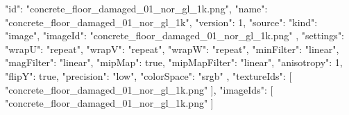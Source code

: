 {
  "id": "concrete_floor_damaged_01_nor_gl_1k.png",
  "name": "concrete_floor_damaged_01_nor_gl_1k",
  "version": 1,
  "source": {
    "kind": "image",
    "imageId": "concrete_floor_damaged_01_nor_gl_1k.png"
  },
  "settings": {
    "wrapU": "repeat",
    "wrapV": "repeat",
    "wrapW": "repeat",
    "minFilter": "linear",
    "magFilter": "linear",
    "mipMap": true,
    "mipMapFilter": "linear",
    "anisotropy": 1,
    "flipY": true,
    "precision": "low",
    "colorSpace": "srgb"
  },
  "textureIds": [
    "concrete_floor_damaged_01_nor_gl_1k.png"
  ],
  "imageIds": [
    "concrete_floor_damaged_01_nor_gl_1k.png"
  ]
}
